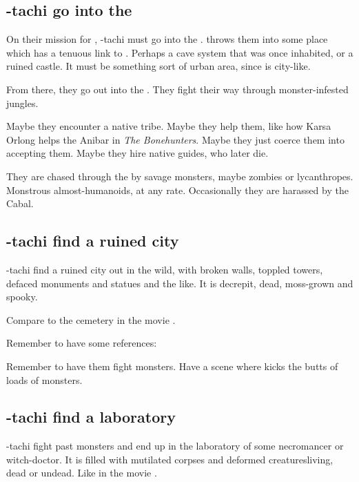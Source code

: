\subsection{\Shilred-tachi go into the \Wylde}
On their mission for \Ishnaruchaefir, \Shilred-tachi must go into the \Wylde{}. \Ishnaruchaefir{} throws them into some place which has a tenuous link to \Nyx. Perhaps a cave system that was once inhabited, or a ruined castle. It must be something sort of urban area, since \Nyx{} is city-like. 

From there, they go out into the \Wylde{}. They fight their way through monster-infested jungles. 

Maybe they encounter a native tribe. Maybe they help them, like how Karsa Orlong helps the Anibar in \emph{The Bonehunters}. Maybe they just coerce them into accepting them. Maybe they hire native guides, who later die. 

They are chased through the \Wylde{} by savage monsters, maybe zombies or lycanthropes. Monstrous almost-humanoids, at any rate. Occasionally they are harassed by the Cabal. 







\subsection{\Shilred-tachi find a ruined city}
\Shilred-tachi find a ruined city out in the wild, with broken walls, toppled towers, defaced monuments and statues and the like. It is decrepit, dead, moss-grown and spooky. 

Compare to the cemetery in the movie \cite{Movie:HouseoftheDead}. 

Remember to have some references: 

Remember to have them fight monsters. Have a scene where \Dzasselid{} kicks the butts of loads of monsters. 







\subsection{\Shilred-tachi find a laboratory}
\Shilred-tachi fight past monsters and end up in the laboratory of some necromancer or witch-doctor. It is filled with mutilated corpses and deformed creatures\dash living, dead or undead. Like in the movie \cite{Movie:HouseoftheDead}. 







